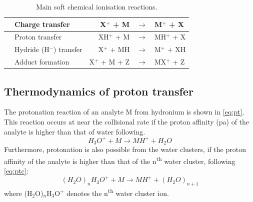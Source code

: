 \begin{table}[ht]
\centering
\caption{Main soft chemical ionisation reactions.}
\label{tb:ge}
\begin{tabular}{ll rcl}
\toprule
\qquad& Charge transfer \quad & X$^+$ + M&$\rightarrow$&M$^+$ + X \qquad\\ \midrule
&Proton transfer \quad & XH$^+$ + M&$\rightarrow$&MH$^+$ + X\\ \midrule
&Hydride (H$^-$) transfer \quad & X$^+$ + MH&$\rightarrow$&M$^+$ + XH\\ \midrule
&Adduct formation \quad & X$^+$ + M + Z&$\rightarrow$&MX$^+$ + Z\\
\bottomrule
\end{tabular}
\end{table}





\subsection{Thermodynamics of proton transfer}
The protonation reaction of an analyte M from hydronium is shown in  \autoref{eq:pt}.
This reaction occurs at near the collisional rate if the proton affinity (\acrshort{pa}) of the analyte is higher than that of water following.
\begin{equation}
\label{eq:pt}
H_3O^+ + M \rightarrow MH^+ + H_2O
\end{equation}
Furthermore, protonation is also possible from the water clusters, if the proton affinity of the analyte is higher than that of the n\textsuperscript{th} water cluster, following \autoref{eq:ptc}:
\begin{equation}
\label{eq:ptc}
(H_2O)_{n}H_3O^+ + M  \rightarrow MH^+ + (H_2O)_{n+1}
\end{equation}
where (H$_2$O)$_{n}$H$_3$O$^+$ denotes the n\textsuperscript{th} water cluster ion.

